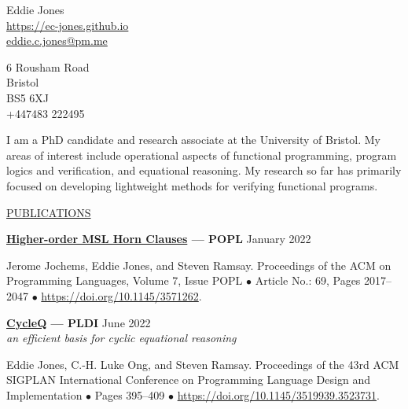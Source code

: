 \documentclass{letter}
\renewcommand{\emph}[1]{\textit{#1}}
\begin{document}
\begin{minipage}[t]{0.7\textwidth}
  \raggedright{}
  {\huge Eddie Jones}
  \\[10pt]

  \href{https://ec-jones.github.io}{https://ec-jones.github.io}\\
  \href{mailto:eddie.c.jones@pm.me}{eddie.c.jones@pm.me}
\end{minipage}
\begin{minipage}[t]{0.3\textwidth}
  \raggedleft{}
  6 Rousham Road\\
  Bristol\\
  BS5 6XJ\\
  +447483 222495
\end{minipage}

\vspace{5pt}

I am a PhD candidate and research associate at the University of Bristol. My areas of interest include operational aspects of functional programming, program logics and verification, and equational reasoning. My research so far has primarily focused on developing lightweight methods for verifying functional programs.

\vspace{10pt}

\uline{{\large PUBLICATIONS}\hfill}

\vspace{5pt}

\textbf{\href{https://dl.acm.org/doi/abs/10.1145/3571262}{Higher-order MSL Horn Clauses} --- POPL} \hfill January 2022

Jerome Jochems, Eddie Jones, and Steven Ramsay.
Proceedings of the ACM on Programming Languages, Volume 7, Issue POPL \( \bullet \) Article No.: 69, Pages 2017--2047 \( \bullet \) \url{https://doi.org/10.1145/3571262}.

\vspace{10pt}

\textbf{\href{https://dl.acm.org/doi/10.1145/3519939.3523731}{CycleQ} --- PLDI} \hfill June 2022\\
\emph{an efficient basis for cyclic equational reasoning}

Eddie Jones, C.-H. Luke Ong, and Steven Ramsay.
Proceedings of the 43rd ACM SIGPLAN International Conference on Programming Language Design and Implementation \( \bullet \) Pages 395--409 \( \bullet \) \url{https://doi.org/10.1145/3519939.3523731}.

\vspace{10pt}
\end{document}
